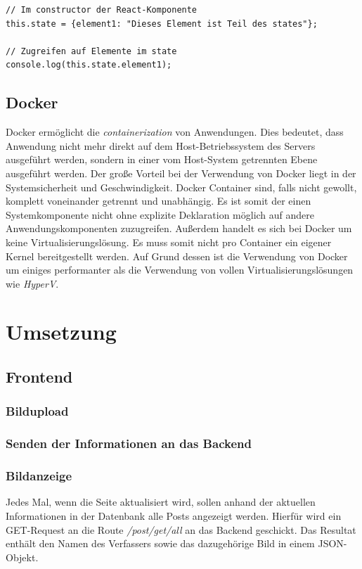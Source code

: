 \documentclass[12pt,a4paper]{report}
\begin{document}
\begin{verbatim}
// Im constructor der React-Komponente
this.state = {element1: "Dieses Element ist Teil des states"};

// Zugreifen auf Elemente im state
console.log(this.state.element1);
\end{verbatim}


\section{Docker}

Docker ermöglicht die \textit{containerization} von Anwendungen. Dies bedeutet, dass Anwendung nicht mehr direkt auf dem Host-Betriebssystem des Servers ausgeführt werden, sondern in einer vom Host-System getrennten Ebene ausgeführt werden. Der große Vorteil bei der Verwendung von Docker liegt in der Systemsicherheit und Geschwindigkeit. Docker Container sind, falls nicht gewollt, komplett voneinander getrennt und unabhängig. Es ist somit der einen Systemkomponente nicht ohne explizite Deklaration möglich auf andere Anwendungskomponenten zuzugreifen. Außerdem handelt es sich bei Docker um keine Virtualisierungslösung. Es muss somit nicht pro Container ein eigener Kernel bereitgestellt werden. Auf Grund dessen ist die Verwendung von Docker um einiges performanter als die Verwendung von vollen Virtualisierungslösungen wie \textit{HyperV}.

\newpage
\chapter{Umsetzung}

\section{Frontend}




\subsection{Bildupload}

\subsection{Senden der Informationen an das Backend}

\subsection{Bildanzeige}
Jedes Mal, wenn die Seite aktualisiert wird, sollen anhand der aktuellen Informationen in der Datenbank alle Posts angezeigt werden. Hierfür wird ein GET-Request an die Route \textit{/post/get/all} an das Backend geschickt. Das Resultat enthält den Namen des Verfassers sowie das dazugehörige Bild in einem JSON-Objekt.
\end{document}
